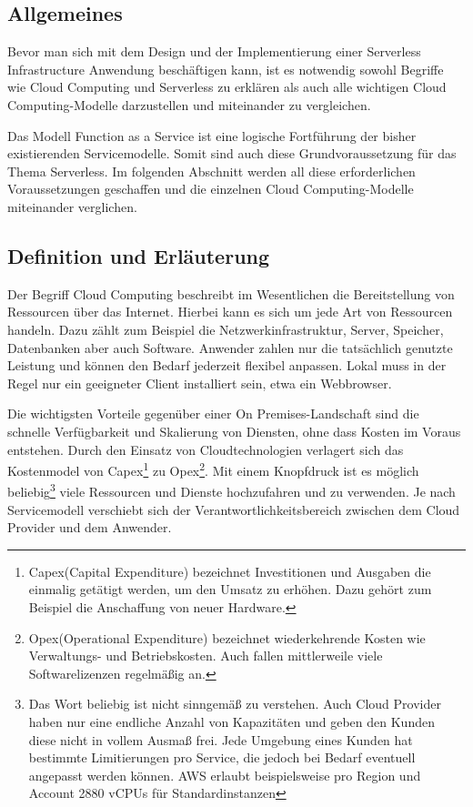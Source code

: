 \subsection{Allgemeines}

Bevor man sich mit dem Design und der Implementierung einer Serverless Infrastructure Anwendung beschäftigen kann, ist es notwendig sowohl Begriffe wie Cloud Computing und Serverless zu erklären als auch alle wichtigen Cloud Computing-Modelle darzustellen und miteinander zu vergleichen.

Das Modell Function as a Service ist eine logische Fortführung der bisher existierenden Servicemodelle.
Somit sind auch diese Grundvoraussetzung für das Thema Serverless.
Im folgenden Abschnitt werden all diese erforderlichen Voraussetzungen geschaffen und die einzelnen Cloud Computing-Modelle miteinander verglichen.


\subsection{Definition und Erläuterung}
Der Begriff Cloud Computing beschreibt im Wesentlichen die Bereitstellung von Ressourcen über das Internet.
Hierbei kann es sich um jede Art von Ressourcen handeln. Dazu zählt zum Beispiel die Netzwerkinfrastruktur, Server, Speicher, Datenbanken aber auch Software.
Anwender zahlen nur die tatsächlich genutzte Leistung und können den Bedarf jederzeit flexibel anpassen.
Lokal muss in der Regel nur ein geeigneter Client installiert sein, etwa ein Webbrowser.

Die wichtigsten Vorteile gegenüber einer On Premises-Landschaft sind die schnelle Verfügbarkeit und Skalierung von Diensten, ohne dass Kosten im Voraus entstehen.
Durch den Einsatz von Cloudtechnologien verlagert sich das Kostenmodel von Capex\footnote{ Capex(Capital Expenditure) bezeichnet Investitionen und Ausgaben die einmalig getätigt werden,
um den Umsatz zu erhöhen. Dazu gehört zum Beispiel die Anschaffung von neuer Hardware. } zu Opex\footnote{Opex(Operational Expenditure) bezeichnet wiederkehrende Kosten wie Verwaltungs- und Betriebskosten.
Auch fallen mittlerweile viele Softwarelizenzen regelmäßig an.}.
Mit einem Knopfdruck ist es möglich beliebig\footnote{Das Wort beliebig ist nicht sinngemäß zu verstehen.
Auch Cloud Provider haben nur eine endliche Anzahl von Kapazitäten und geben den Kunden diese nicht in vollem Ausmaß frei.
Jede Umgebung eines Kunden hat bestimmte Limitierungen pro Service, die jedoch bei Bedarf eventuell angepasst werden können.
AWS erlaubt beispielsweise pro Region und Account 2880 vCPUs für Standardinstanzen } viele Ressourcen und Dienste hochzufahren und zu verwenden.
Je nach Servicemodell verschiebt sich der Verantwortlichkeitsbereich zwischen dem Cloud Provider und dem Anwender.
\cite{CloudComputingDef}

